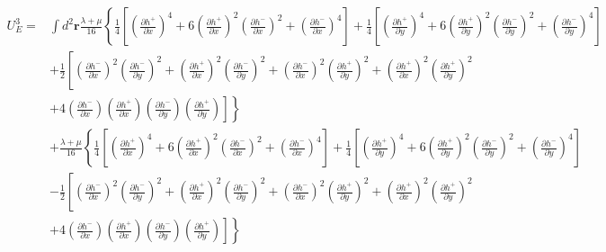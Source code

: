\documentclass[aps,prx,10pt,twocolumn,superscriptaddress]{revtex4}
\begin{document}
\begin{widetext}
\begin{align}
U^{3}_{E}=&\int d^{2}\textbf{r}\frac{\lambda+\mu}{16}\left\{ \frac{1}{4}\left[ \left(\frac{\partial h^{+}}{\partial x}\right)^{4} +6\left(\frac{\partial h^{+}}{\partial x}\right)^{2}\left(\frac{\partial h^{-}}{\partial x}\right)^{2} +\left(\frac{\partial h^{-}}{\partial x}\right)^{4} \right] + \frac{1}{4}\left[ \left(\frac{\partial h^{+}}{\partial y}\right)^{4} +6\left(\frac{\partial h^{+}}{\partial y}\right)^{2}\left(\frac{\partial h^{-}}{\partial y}\right)^{2} +\left(\frac{\partial h^{-}}{\partial y}\right)^{4} \right]  \right.\nonumber\\
& +\frac{1}{2}\left[ \left(\frac{\partial h^{-}}{\partial x}\right)^{2}\left(\frac{\partial h^{-}}{\partial y}\right)^{2} + \left(\frac{\partial h^{+}}{\partial x}\right)^{2}\left(\frac{\partial h^{-}}{\partial y}\right)^{2} + \left(\frac{\partial h^{-}}{\partial x}\right)^{2}\left(\frac{\partial h^{+}}{\partial y}\right)^{2} + \left(\frac{\partial h^{+}}{\partial x}\right)^{2}\left(\frac{\partial h^{+}}{\partial y}\right)^{2} \right.\nonumber \\
&\left.\left. +4 \left(\frac{\partial h^{-}}{\partial x}\right)\left(\frac{\partial h^{+}}{\partial x}\right) \left(\frac{\partial h^{-}}{\partial y}\right)\left(\frac{\partial h^{+}}{\partial y}\right)\right] \right\}\nonumber \\
&+\frac{\lambda+\mu}{16}\left\{ \frac{1}{4}\left[ \left(\frac{\partial h^{+}}{\partial x}\right)^{4} +6\left(\frac{\partial h^{+}}{\partial x}\right)^{2}\left(\frac{\partial h^{-}}{\partial x}\right)^{2} +\left(\frac{\partial h^{-}}{\partial x}\right)^{4} \right] + \frac{1}{4}\left[ \left(\frac{\partial h^{+}}{\partial y}\right)^{4} +6\left(\frac{\partial h^{+}}{\partial y}\right)^{2}\left(\frac{\partial h^{-}}{\partial y}\right)^{2} +\left(\frac{\partial h^{-}}{\partial y}\right)^{4} \right]  \right.\nonumber\\
& -\frac{1}{2}\left[ \left(\frac{\partial h^{-}}{\partial x}\right)^{2}\left(\frac{\partial h^{-}}{\partial y}\right)^{2} + \left(\frac{\partial h^{+}}{\partial x}\right)^{2}\left(\frac{\partial h^{-}}{\partial y}\right)^{2} + \left(\frac{\partial h^{-}}{\partial x}\right)^{2}\left(\frac{\partial h^{+}}{\partial y}\right)^{2} + \left(\frac{\partial h^{+}}{\partial x}\right)^{2}\left(\frac{\partial h^{+}}{\partial y}\right)^{2} \right. \nonumber\\
&\left.\left. +4 \left(\frac{\partial h^{-}}{\partial x}\right)\left(\frac{\partial h^{+}}{\partial x}\right) \left(\frac{\partial h^{-}}{\partial y}\right)\left(\frac{\partial h^{+}}{\partial y}\right)\right] \right\}\nonumber \\

\end{align}
\end{widetext}
\end{document}
